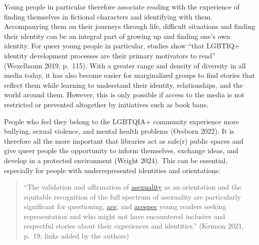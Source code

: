 \documentclass[a4paper,
fontsize=11pt,
oneside,
numbers=noperiodatend,
parskip=half-,
bibliography=totoc,
final
]{scrartcl}
\begin{document}
Young people in particular therefore associate reading with the
experience of finding themselves in fictional characters and identifying
with them. Accompanying them on their journeys through life, difficult
situations and finding their identity can be an integral part of growing
up and finding one's own identity. For queer young
people in particular, studies show \enquote{that LGBTIQ+ identity development
processes are their primary motivators to read} (Wexelbaum 2019,
p.~115). With a greater range and density of diversity in all media
today, it has also become easier for marginalized groups to find stories
that reflect them while learning to understand their identity,
relationships, and the world around them. However, this is only possible
if access to the media is not restricted or prevented altogether by
initiatives such as book bans.

People who feel they belong to the LGBTQIA+ community experience more
bullying, sexual violence, and mental health problems (Orsborn 2022). It
is therefore all the more important that libraries act as safe(r) public
spaces and give queer people the opportunity to inform themselves,
exchange ideas, and develop in a protected environment (Wright 2024).
This can be essential, especially for people with underrepresented
identities and orientations:

\begin{quote}
\enquote{The validation and affirmation of
\href{https://lgbtqia.fandom.com/wiki/Asexual}{asexuality} as an
orientation and the equitable recognition of the full spectrum of
asexuality are particularly significant for questioning,
\href{https://lgbtqia.fandom.com/wiki/Asexual}{ace}, and
\href{https://lgbtqia.fandom.com/wiki/Asexual_spectrum}{acespec} young
readers seeking representation and who might not have encountered
inclusive and respectful stories about their experiences and
identities.} (Kennon 2021, p.~19; links added by the authors)
\end{quote}
\end{document}
